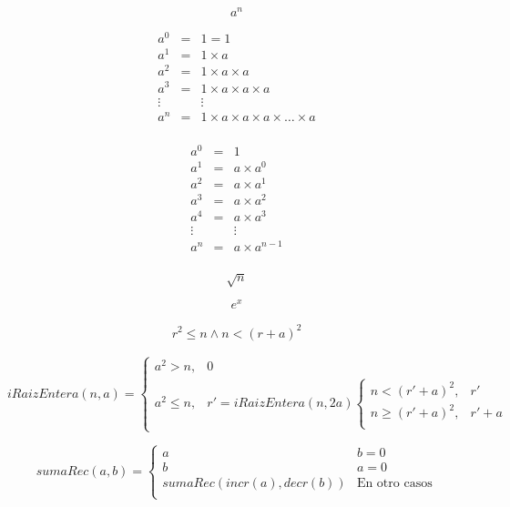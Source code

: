 \documentclass[12pt,letterpaper]{article}
\begin{document}
\[
  a^n
\]

\begin{eqnarray*}
  a^0 & = & 1 = 1 \\
  a^1 & = & 1 \times a \\
  a^2 & = & 1 \times a \times a\\
  a^3 & = & 1 \times a \times a \times a \\
  \vdots & & \vdots \\
  a^n & = & 1 \times a \times a \times a \times \ldots \times a \\
\end{eqnarray*}

\begin{eqnarray*}
  a^0 & = & 1  \\
  a^1 & = & a \times a^0   \\
  a^2 & = & a \times a^1  \\
  a^3 & = & a \times a^2 \\
  a^4 & = & a \times a^3 \\
  \vdots & & \vdots \\
  a^n & = & a \times a^{n-1} \\
\end{eqnarray*}


\[
  \sqrt{n}
\]

\[
  e^x
\]

\begin{eqnarray*}
  r^2 \leq n \wedge n < (r + a)^2
\end{eqnarray*}


\[
  iRaizEntera(n,a) =
  \begin{cases}
    a^2 > n, & 0 \\
    a^2 \leq n, & r' = iRaizEntera(n,2a)
    \begin{cases}
      n < (r' + a)^2, & r' \\
      n \geq (r' + a)^2, & r' + a \\
    \end{cases}
  \end{cases}
\]


\[
  sumaRec(a,b) = 
  \begin{cases}
    a & b = 0\\
    b & a = 0\\
    sumaRec(incr(a),decr(b)) & \text{En otro casos} \\
  \end{cases}
\]

\end{document}
